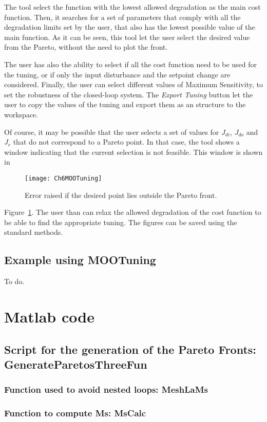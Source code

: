 The tool select the function with the lowest allowed degradation as the main cost function. Then, it searches for a set of parameters that comply with all the degradation limits set by the user, that also has the lowest possible value of the main function. As it can be seen, this tool let the user select the desired value from the Pareto, without the need to plot the front.

The user has also the ability to select if all the cost function need to be used for the tuning, or if only the input disturbance and the setpoint change are considered. Finally, the user can select different values of Maximum Sensitivity, to set the robustness of the closed-loop system. The \textit{Export Tuning} button let the user to copy the values of the tuning and export them as an structure to the \matlab{} workspace.

Of course, it may be possible that the user selects a set of values for $J_{di}$, $J_{do}$ and $J_r$ that do not correspond to a Pareto point. In that case, the tool shows a window indicating that the current selection is not feasible. This window is shown in %
%
\begin{figure}[tb]
	\centering
	\texttt{[image: Ch6MOOTuning]}
	\caption{Error raised if the desired point lies outside the Pareto front.}
	\label{fig:Ch6MOOTuning}
\end{figure}
%
Figure~\ref{fig:Ch6MOOTuning}. The user than can relax the allowed degradation of the cost function to be able to find the appropriate tuning. The figures can be saved using the standard \matlab{} methods.

\subsection{Example using MOOTuning}
\label{sec:MOOTuningExample}
To do.

\section{Matlab code}
\label{sec:MatlabBode}
\subsection{Script for the generation of the Pareto Fronts: GenerateParetosThreeFun}

\subsubsection{Function used to avoid nested loops: MeshLaMs}

\subsubsection{Function to compute Ms: MsCalc}
